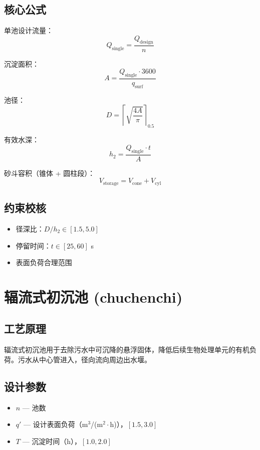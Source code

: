 \documentclass[12pt,a4paper]{ctexart}
\begin{document}
\subsection{核心公式}
单池设计流量：
\begin{equation}
Q_{\text{single}} = \frac{Q_{\text{design}}}{n}
\end{equation}

沉淀面积：
\begin{equation}
A = \frac{Q_{\text{single}} \cdot 3600}{q_{\text{surf}}}
\end{equation}

池径：
\begin{equation}
D = \left\lceil \sqrt{\frac{4A}{\pi}} \right\rceil_{0.5}
\end{equation}

有效水深：
\begin{equation}
h_2 = \frac{Q_{\text{single}} \cdot t}{A}
\end{equation}

砂斗容积（锥体 + 圆柱段）：
\begin{equation}
V_{\text{storage}} = V_{\text{cone}} + V_{\text{cyl}}
\end{equation}

\subsection{约束校核}
\begin{itemize}
  \item 径深比：$D/h_2 \in [1.5, 5.0]$
  \item 停留时间：$t \in [25, 60]$ s
  \item 表面负荷合理范围
\end{itemize}

\section{辐流式初沉池 (chuchenchi)}

\subsection{工艺原理}
辐流式初沉池用于去除污水中可沉降的悬浮固体，降低后续生物处理单元的有机负荷。污水从中心管进入，径向流向周边出水堰。

\subsection{设计参数}
\begin{itemize}
  \item $n$ — 池数
  \item $q'$ — 设计表面负荷（m$^3$/(m$^2\cdot$h)），$[1.5, 3.0]$
  \item $T$ — 沉淀时间（h），$[1.0, 2.0]$
\end{itemize}
\end{document}
